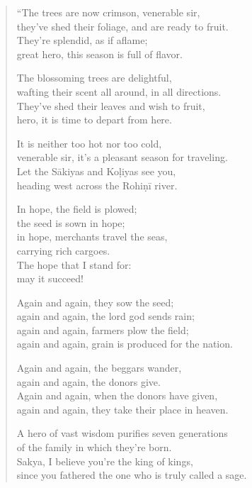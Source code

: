 \documentclass[12pt,openany]{book}%
\begin{document}
\begin{verse}%
“The trees are now crimson, venerable sir, \\
they’ve shed their foliage, and are ready to fruit. \\
They’re splendid, as if aflame; \\
great hero, this season is full of flavor. 

The blossoming trees are delightful, \\
wafting their scent all around, in all directions. \\
They’ve shed their leaves and wish to fruit, \\
hero, it is time to depart from here. 

It is neither too hot nor too cold, \\
venerable sir, it’s a pleasant season for traveling. \\
Let the \textsanskrit{Sākiyas} and \textsanskrit{Koḷiyas} see you, \\
heading west across the \textsanskrit{Rohiṇī} river. 

In hope, the field is plowed; \\
the seed is sown in hope; \\
in hope, merchants travel the seas, \\
carrying rich cargoes. \\
The hope that I stand for: \\
may it succeed! 

Again and again, they sow the seed; \\
again and again, the lord god sends rain; \\
again and again, farmers plow the field; \\
again and again, grain is produced for the nation. 

Again and again, the beggars wander, \\
again and again, the donors give. \\
Again and again, when the donors have given, \\
again and again, they take their place in heaven. 

A hero of vast wisdom purifies seven generations \\
of the family in which they’re born. \\
Sakya, I believe you’re the king of kings, \\
since you fathered the one who is truly called a sage. 


\end{verse}
\end{document}
